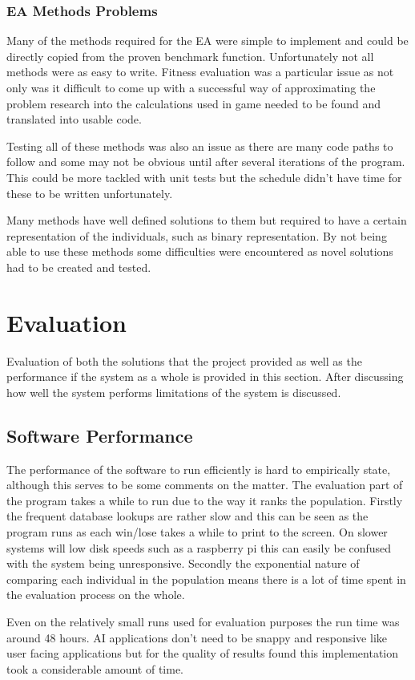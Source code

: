 \documentclass[a4paper]{article}
\begin{document}
\subsubsection{EA Methods Problems}
Many of the methods required for the EA were simple to implement and could be directly copied from the proven benchmark function.
Unfortunately not all methods were as easy to write.
Fitness evaluation was a particular issue as not only was it difficult to come up with a successful way of approximating the problem research into the calculations used in game needed to be found and translated into usable code.
\par
Testing all of these methods was also an issue as there are many code paths to follow and some may not be obvious until after several iterations of the program.
This could be more tackled with unit tests but the schedule didn't have time for these to be written unfortunately.
\par
Many methods have well defined solutions to them but required to have a certain representation of the individuals, such as binary representation.
By not being able to use these methods some difficulties were encountered as novel solutions had to be created and tested.
\section{Evaluation}
Evaluation of both the solutions that the project provided as well as the performance if the system as a whole is provided in this section.
After discussing how well the system performs limitations of the system is discussed.
\subsection{Software Performance}
The performance of the software to run efficiently is hard to empirically state, although this serves to be some comments on the matter.
The evaluation part of the program takes a while to run due to the way it ranks the population.
Firstly the frequent database lookups are rather slow and this can be seen as the program runs as each win/lose takes a while to print to the screen.
On slower systems will low disk speeds such as a raspberry pi this can easily be confused with the system being unresponsive.
Secondly the exponential nature of comparing each individual in the population means there is a lot of time spent in the evaluation process on the whole.
\par
Even on the relatively small runs used for evaluation purposes the run time was around 48 hours.
AI applications don't need to be snappy and responsive like user facing applications but for the quality of results found this implementation took a considerable amount of time.
\end{document}
